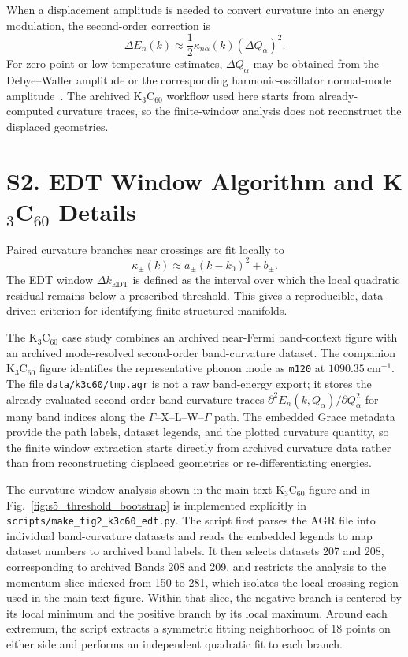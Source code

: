 \documentclass[12pt]{article}
\begin{document}
When a displacement amplitude is needed to convert curvature into an energy
modulation, the second-order correction is
\begin{equation}
\Delta E_n(k)
\approx
\frac{1}{2}\kappa_{n\alpha}(k)(\Delta Q_\alpha)^2 .
\end{equation}
For zero-point or low-temperature estimates, $\Delta Q_\alpha$ may be obtained
from the Debye--Waller amplitude or the corresponding harmonic-oscillator
normal-mode amplitude~\cite{Ziman1972,AshcroftMermin}. The archived K$_3$C$_{60}$
workflow used here starts from already-computed curvature traces, so the
finite-window analysis does not reconstruct the displaced geometries.

\section*{S2. EDT Window Algorithm and K$_3$C$_{60}$ Details}

Paired curvature branches near crossings are fit locally to
\begin{equation}
\kappa_\pm(k)\approx a_\pm(k-k_0)^2+b_\pm .
\end{equation}
The EDT window $\Delta k_{\mathrm{EDT}}$ is defined as the interval over which
the local quadratic residual remains below a prescribed threshold. This gives a
reproducible, data-driven criterion for identifying finite structured manifolds.

The K$_3$C$_{60}$ case study combines an archived near-Fermi band-context figure
with an archived mode-resolved second-order band-curvature dataset. The
companion K$_3$C$_{60}$ figure identifies the representative phonon mode as
\texttt{m120} at $1090.35~\mathrm{cm}^{-1}$. The file
\texttt{data/k3c60/tmp.agr} is not a raw band-energy export; it stores the
already-evaluated second-order band-curvature traces
$\partial^2 E_n(k,Q_\alpha)/\partial Q_\alpha^2$ for many band indices along
the $\Gamma$--X--L--W--$\Gamma$ path. The embedded Grace metadata provide the
path labels, dataset legends, and the plotted curvature quantity, so the finite
window extraction starts directly from archived curvature data rather than from
reconstructing displaced geometries or re-differentiating energies.

The curvature-window analysis shown in the main-text K$_3$C$_{60}$ figure and
in Fig.~\ref{fig:s5_threshold_bootstrap} is implemented explicitly in
\texttt{scripts/make\_fig2\_k3c60\_edt.py}. The script first parses the AGR file
into individual band-curvature datasets and reads the embedded legends to map
dataset numbers to archived band labels. It then selects datasets 207 and 208,
corresponding to archived Bands 208 and 209, and restricts the analysis to the
momentum slice indexed from 150 to 281, which isolates the local crossing
region used in the main-text figure. Within that slice, the negative branch is
centered by its local minimum and the positive branch by its local maximum.
Around each extremum, the script extracts a symmetric fitting neighborhood of
18 points on either side and performs an independent quadratic fit to each
branch.
\end{document}
